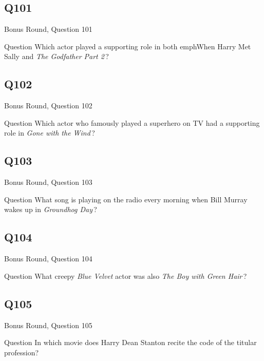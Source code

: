 \documentclass[11pt]{beamer}
\begin{document}
\subsection*{Q101}
\begin{frame}[t]{Bonus Round, Question 101}
  \vspace{2em}
  \begin{block}{Question}
    Which actor played a supporting role in both emph{When Harry Met Sally} and \emph{The Godfather Part 2}\,?
  \end{block}
\end{frame}


\subsection*{Q102}
\begin{frame}[t]{Bonus Round, Question 102}
  \vspace{2em}
  \begin{block}{Question}
    Which actor who famously played a superhero on TV had a supporting role in \emph{Gone with the Wind}\,?
  \end{block}
\end{frame}


\subsection*{Q103}
\begin{frame}[t]{Bonus Round, Question 103}
  \vspace{2em}
  \begin{block}{Question}
    What song is playing on the radio every morning when Bill Murray wakes up in \emph{Groundhog Day}\,?
  \end{block}
\end{frame}


\subsection*{Q104}
\begin{frame}[t]{Bonus Round, Question 104}
  \vspace{2em}
  \begin{block}{Question}
    What creepy \emph{Blue Velvet} actor was also \emph{The Boy with Green Hair}\,?
  \end{block}
\end{frame}


\subsection*{Q105}
\begin{frame}[t]{Bonus Round, Question 105}
  \vspace{2em}
  \begin{block}{Question}
    In which movie does Harry Dean Stanton recite the code of the titular profession?
  \end{block}
\end{frame}
\end{document}
